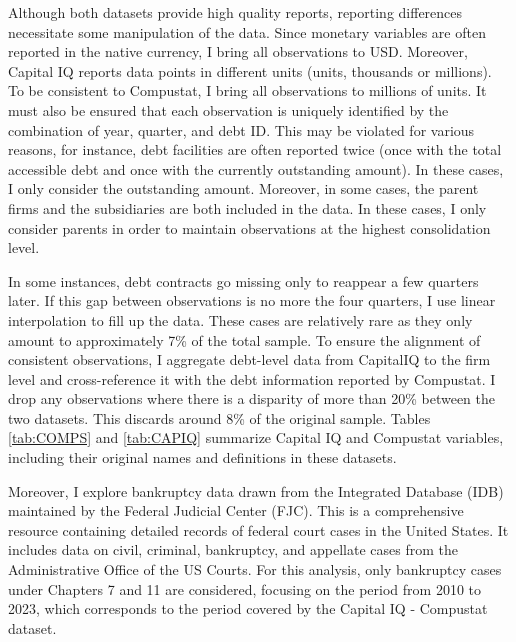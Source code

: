 \documentclass[12pt]{article}
\begin{document}
Although both datasets provide high quality reports, reporting differences necessitate some manipulation of the data. Since monetary variables are often reported in the native currency, I bring all observations to USD. Moreover, Capital IQ reports data points in different units (units, thousands or millions). To be consistent to Compustat, I bring all observations to millions of units. It must also be ensured that each observation is uniquely identified by the combination of year, quarter, and debt ID. This may be violated for various reasons, for instance, debt facilities are often reported twice (once with the total accessible debt and once with the currently outstanding amount). In these cases, I only consider the outstanding amount. Moreover, in some cases, the parent firms and the subsidiaries are both included in the data. In these cases, I only consider parents in order to maintain observations at the highest consolidation level. 

In some instances, debt contracts go missing only to reappear a few quarters later. If this gap between observations is no more the four quarters, I use linear interpolation to fill up the data. These cases are relatively rare as they only amount to approximately 7\% of the total sample. To ensure the alignment of consistent observations, I aggregate debt-level data from CapitalIQ to the firm level and cross-reference it with the debt information reported by Compustat. I drop any observations where there is a disparity of more than 20\% between the two datasets. This discards around 8\% of the original sample. Tables \ref{tab:COMPS} and \ref{tab:CAPIQ} summarize Capital IQ and Compustat variables, including their original names and definitions in these datasets. 

Moreover, I explore bankruptcy data drawn from the Integrated Database (IDB) maintained by the Federal Judicial Center (FJC). This is a comprehensive resource containing detailed records of federal court cases in the United States. It includes data on civil, criminal, bankruptcy, and appellate cases from the Administrative Office of the US Courts. For this analysis, only bankruptcy cases under Chapters 7 and 11 are considered, focusing on the period from 2010 to 2023, which corresponds to the period covered by the Capital IQ - Compustat dataset. 
\end{document}

